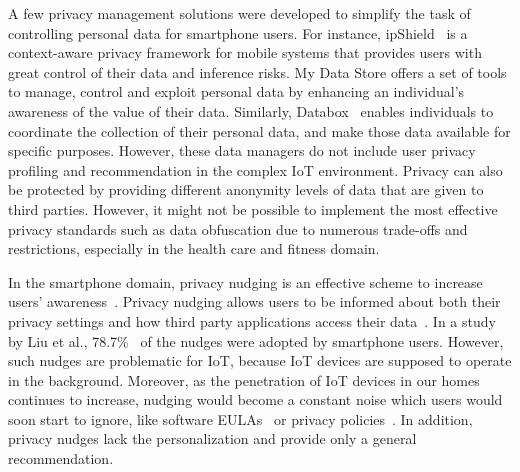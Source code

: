 A few privacy management solutions were developed to simplify the task of controlling personal data for smartphone users. For instance, ipShield~\cite{chakraborty2014ipshield} is a context-aware privacy framework for mobile systems that provides users with great control of their data and inference risks. My Data Store \cite{ref:vescovi} offers a set of tools to manage, control and exploit personal data by enhancing an individual’s awareness of the value of their data. Similarly, Databox~\cite{ref:chaudhry} enables individuals to coordinate the collection of their personal data, and make those data available for specific purposes. However, these data managers do not include user privacy profiling and recommendation in the complex IoT environment. Privacy can also be protected by providing different anonymity levels of data that are given to third parties. However, it might not be possible to implement the most effective privacy standards such as data obfuscation due to numerous trade-offs and restrictions, especially in the health care and fitness domain.

In the smartphone domain, privacy nudging is an effective scheme to increase users' awareness~\cite{almuhimedi2015your}. Privacy nudging allows users to be informed about both their privacy settings and how third party applications access their data~\cite{liu2016follow,fu2014field}. In a study by Liu et al., 78.7\%~\cite{liu2016follow} of the nudges were adopted by smartphone users. However, such nudges are problematic for IoT, because IoT devices are supposed to operate in the background. Moreover, as the penetration of IoT devices in our homes continues to increase, nudging would become a constant noise which users would soon start to ignore, like software EULAs~\cite{good2005spyware} or privacy policies~\cite{jensen2004privacy}. In addition, privacy nudges lack the personalization and provide only a general recommendation.


